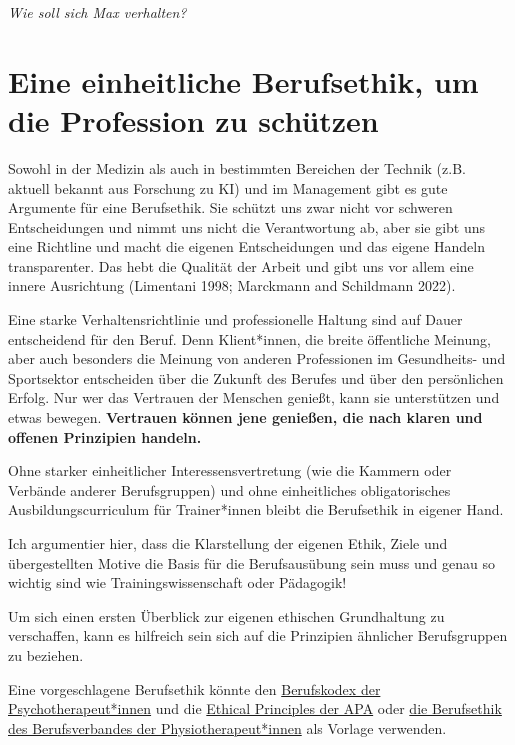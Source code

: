 \documentclass[
  letterpaper,
  DIV=11,
  numbers=noendperiod]{scrreprt}
\begin{document}
\emph{Wie soll sich Max verhalten?}

\section{Eine einheitliche Berufsethik, um die Profession zu
schützen}\label{sec-ethikschuetzt}

Sowohl in der Medizin als auch in bestimmten Bereichen der Technik (z.B.
aktuell bekannt aus Forschung zu KI) und im Management gibt es gute
Argumente für eine Berufsethik. Sie schützt uns zwar nicht vor schweren
Entscheidungen und nimmt uns nicht die Verantwortung ab, aber sie gibt
uns eine Richtline und macht die eigenen Entscheidungen und das eigene
Handeln transparenter. Das hebt die Qualität der Arbeit und gibt uns vor
allem eine innere Ausrichtung (Limentani 1998; Marckmann and Schildmann
2022).

Eine starke Verhaltensrichtlinie und professionelle Haltung sind auf
Dauer entscheidend für den Beruf. Denn Klient*innen, die breite
öffentliche Meinung, aber auch besonders die Meinung von anderen
Professionen im Gesundheits- und Sportsektor entscheiden über die
Zukunft des Berufes und über den persönlichen Erfolg. Nur wer das
Vertrauen der Menschen genießt, kann sie unterstützen und etwas bewegen.
\textbf{Vertrauen können jene genießen, die nach klaren und offenen
Prinzipien handeln.}

Ohne starker einheitlicher Interessensvertretung (wie die Kammern oder
Verbände anderer Berufsgruppen) und ohne einheitliches obligatorisches
Ausbildungscurriculum für Trainer*innen bleibt die Berufsethik in
eigener Hand.

Ich argumentier hier, dass die Klarstellung der eigenen Ethik, Ziele und
übergestellten Motive die Basis für die Berufsausübung sein muss und
genau so wichtig sind wie Trainingswissenschaft oder Pädagogik!

Um sich einen ersten Überblick zur eigenen ethischen Grundhaltung zu
verschaffen, kann es hilfreich sein sich auf die Prinzipien ähnlicher
Berufsgruppen zu beziehen.

Eine vorgeschlagene Berufsethik könnte den
\href{https://www.sozialministerium.at/dam/jcr:dea97f39-8567-4677-a84b-747fc49612a2/Berufskodex.pdf}{Berufskodex
der Psychotherapeut*innen} und die
\href{https://www.apa.org/ethics/code}{Ethical Principles der APA} oder
\href{https://www.physioaustria.at/sites/default/files/collection_files/physioaustriaethischegrundsaetze_0.pdf}{die
Berufsethik des Berufsverbandes der Physiotherapeut*innen} als Vorlage
verwenden.
\end{document}
